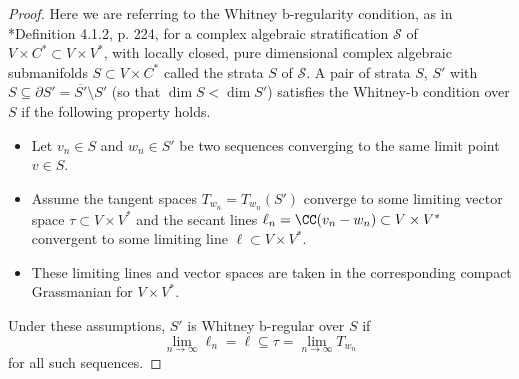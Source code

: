 \documentclass[11pt,letterpaper]{amsart}
\numberwithin{equation}{section}
\begin{document}
\begin{proof}
    Here we are referring to the Whitney b-regularity condition, as in \cite{Sch03}*{Definition 4.1.2, p. 224}, for a complex algebraic stratification $\mathscr{S}$ of $V\times C^*\subset V\times V^*$, with locally closed, pure dimensional complex algebraic submanifolds $S\subset V\times C^*$ called the strata $S$ of $\mathscr{S}$.
    A pair of strata $S$, $S'$ with $S\subseteq \partial S' = \overline{S'}\setminus S'$ (so that $\dim S< \dim S'$) satisfies the Whitney-b condition over $S$ if the following property holds.
    \begin{itemize}
        \item Let $v_n\in S$ and $w_n\in S'$ be two sequences converging to the same limit point $v\in S$.
        \item Assume the tangent spaces $T_{w_n} = T_{w_n}(S')$ converge to some limiting vector space $\tau \subset V\times V^*$ and the secant lines $\ell_n = \CC(v_n-w_n) \subset V\times V^*$ convergent to some limiting line $\ell\subset V\times V^*$.
        \item These limiting lines and vector spaces are taken in the corresponding compact Grassmanian for $V\times V^*$.
    \end{itemize}
Under these assumptions, $S'$ is Whitney b-regular over $S$ if 
\begin{equation}
\lim_{n\to \infty} \ell_n = \ell \subseteq \tau = \lim_{n\to \infty} T_{w_n}
\end{equation}
    for all such sequences.


\end{proof}
\end{document}
